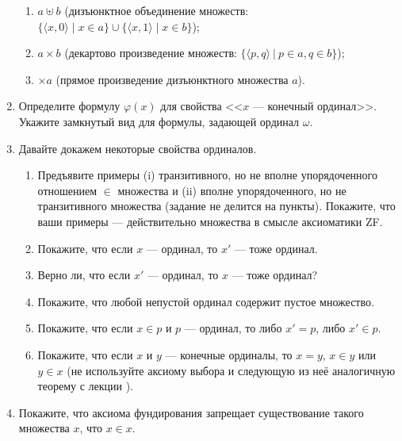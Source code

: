 \documentclass[10pt,a4paper,oneside]{article}
\begin{document}
\begin{enumerate}
\begin{enumerate}
\item $a \uplus b$ (дизъюнктное объединение множеств: $\{\langle x,0\rangle\mid x\in a\}\cup\{\langle x,1\rangle\mid x\in b\}$);
\item $a \times b$ (декартово произведение множеств: $\{\langle p,q\rangle\ |\ p\in a, q\in b\}$);
\item $\times a$ (прямое произведение дизъюнктного множества $a$).
\end{enumerate}
\item Определите формулу $\varphi(x)$ для свойства <<$x$ --- конечный ординал>>. Укажите замкнутый
вид для формулы, задающей ординал $\omega$.
\item Давайте докажем некоторые свойства ординалов.
\begin{enumerate}
\item Предъявите примеры (i) транзитивного, но не вполне упорядоченного отношением $\in$ множества и (ii) вполне упорядоченного,
но не транзитивного множества (задание не делится на пункты). Покажите, что ваши примеры --- действительно множества в смысле аксиоматики ZF.
\item Покажите, что если $x$ --- ординал, то $x'$ --- тоже ординал.
\item Верно ли, что если $x'$ --- ординал, то $x$ --- тоже ординал?
\item Покажите, что любой непустой ординал содержит пустое множество.
\item Покажите, что если $x \in p$ и $p$ --- ординал, то либо $x' = p$, либо $x' \in p$.
\item Покажите, что если $x$ и $y$ --- конечные ординалы, то $x = y$, $x \in y$ или $y \in x$ (не используйте аксиому выбора
и следующую из неё аналогичную теорему с лекции ).
\end{enumerate}
\item Покажите, что аксиома фундирования запрещает существование такого множества $x$, что $x \in x$.

\end{enumerate}
\end{document}

